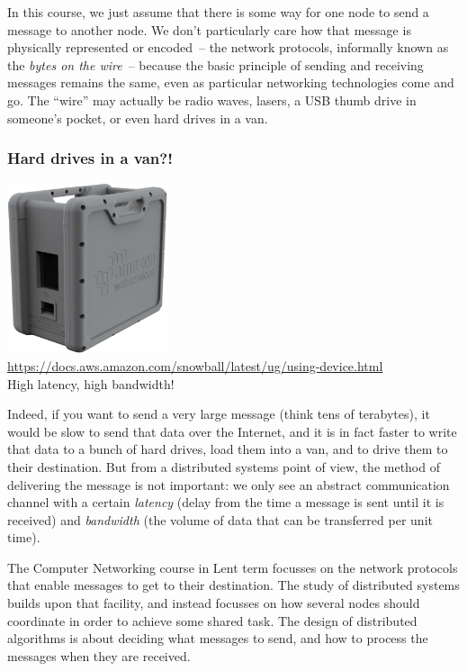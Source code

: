 In this course, we just assume that there is some way for one node to send a message to another node.
We don't particularly care how that message is physically represented or encoded~-- the network protocols, informally known as the \emph{bytes on the wire}~-- because the basic principle of sending and receiving messages remains the same, even as particular networking technologies come and go.
The ``wire'' may actually be radio waves, lasers, a USB thumb drive in someone's pocket, or even hard drives in a van.

\begin{frame}[plain]
    \label{s:snowball}
    \frametitle{Hard drives in a van?!}
    \begin{center}
        \includegraphics[height=5cm]{images/aws-snowball.png}\\[0.5em]
        \scriptsize{\url{https://docs.aws.amazon.com/snowball/latest/ug/using-device.html}}\\[2em]
        High latency, high bandwidth!
    \end{center}
\end{frame}

Indeed, if you want to send a very large message (think tens of terabytes), it would be slow to send that data over the Internet, and it is in fact faster to write that data to a bunch of hard drives, load them into a van, and to drive them to their destination.
But from a distributed systems point of view, the method of delivering the message is not important: we only see an abstract communication channel with a certain \emph{latency} (delay from the time a message is sent until it is received) and \emph{bandwidth} (the volume of data that can be transferred per unit time).

The Computer Networking course in Lent term focusses on the network protocols that enable messages to get to their destination.
The study of distributed systems builds upon that facility, and instead focusses on how several nodes should coordinate in order to achieve some shared task.
The design of distributed algorithms is about deciding what messages to send, and how to process the messages when they are received.

